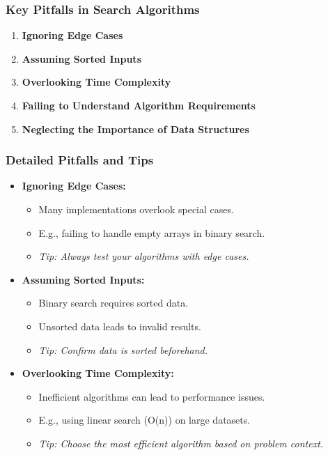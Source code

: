 \documentclass[aspectratio=169]{beamer}
\begin{document}
\begin{frame}
    \frametitle{Key Pitfalls in Search Algorithms}
    \begin{enumerate}
        \item \textbf{Ignoring Edge Cases}
        \item \textbf{Assuming Sorted Inputs}
        \item \textbf{Overlooking Time Complexity}
        \item \textbf{Failing to Understand Algorithm Requirements}
        \item \textbf{Neglecting the Importance of Data Structures}
    \end{enumerate}
\end{frame}

\begin{frame}[fragile]
    \frametitle{Detailed Pitfalls and Tips}
    \begin{itemize}
        \item \textbf{Ignoring Edge Cases:}
            \begin{itemize}
                \item Many implementations overlook special cases.
                \item E.g., failing to handle empty arrays in binary search.
                \item \textit{Tip: Always test your algorithms with edge cases.}
            \end{itemize}
            
        \item \textbf{Assuming Sorted Inputs:}
            \begin{itemize}
                \item Binary search requires sorted data.
                \item Unsorted data leads to invalid results.
                \item \textit{Tip: Confirm data is sorted beforehand.}
            \end{itemize}
            
        \item \textbf{Overlooking Time Complexity:}
            \begin{itemize}
                \item Inefficient algorithms can lead to performance issues.
                \item E.g., using linear search (O(n)) on large datasets.
                \item \textit{Tip: Choose the most efficient algorithm based on problem context.}
            \end{itemize}
    \end{itemize}
\end{frame}
\end{document}
